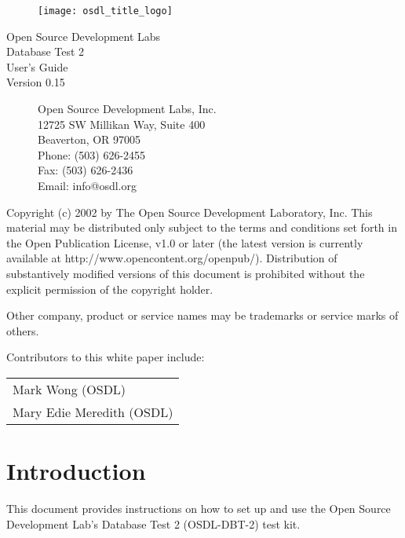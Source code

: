 \documentclass{article}
\begin{document}
\begin{titlepage}

\begin{figure}[t]
\centering
\texttt{[image: osdl\_title\_logo]}
\end{figure}

\centering
\huge
Open Source Development Labs \\
Database Test 2 \\
\Huge
User's Guide \\
\LARGE
Version 0.15

\begin{figure}[b]
\flushleft
\normalsize
Open Source Development Labs, Inc. \\
12725 SW Millikan Way, Suite 400 \\
Beaverton, OR 97005 \\
Phone: (503) 626-2455 \\
Fax: (503) 626-2436 \\
Email: info@osdl.org
\end{figure}

\end{titlepage}

Copyright (c) 2002 by The Open Source Development Laboratory, Inc. This
material may be distributed only subject to the terms and conditions set forth
in the Open Publication License, v1.0 or later (the latest version is currently
available at http://www.opencontent.org/openpub/). Distribution of
substantively modified versions of this document is prohibited without the
explicit permission of the copyright holder.

Other company, product or service names may be trademarks or service marks of
others.

Contributors to this white paper include: \\
\begin{tabular}[c]{l}
Mark Wong (OSDL) \\
Mary Edie Meredith (OSDL) \\
\end{tabular}

\pagebreak

\section{Introduction}

This document provides instructions on how to set up and use the Open Source
Development Lab's Database Test 2 (OSDL-DBT-2) test kit.
\end{document}
